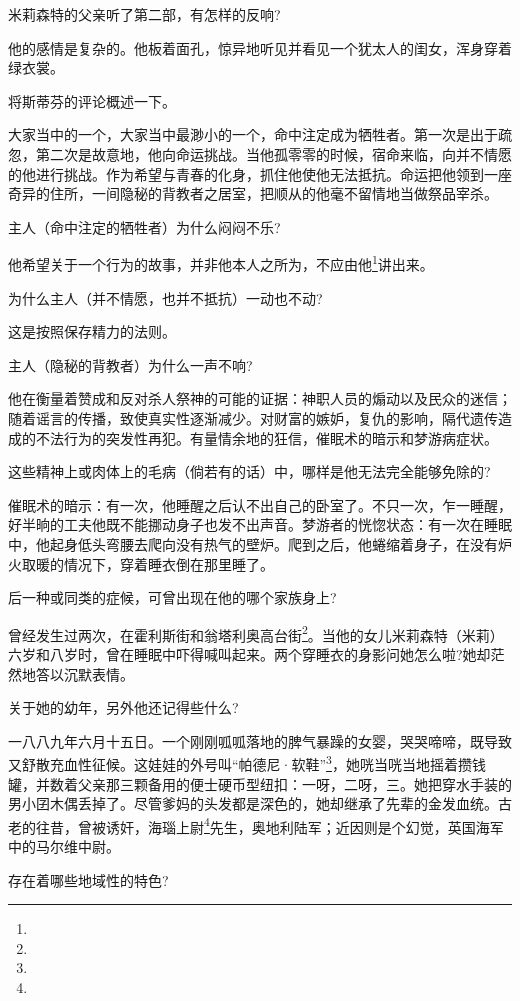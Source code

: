 \par 米莉森特的父亲听了第二部，有怎样的反响?
\par 他的感情是复杂的。他板着面孔，惊异地听见并看见一个犹太人的闺女，浑身穿着绿衣裳。
\par 将斯蒂芬的评论概述一下。
\par 大家当中的一个，大家当中最渺小的一个，命中注定成为牺牲者。第一次是出于疏忽，第二次是故意地，他向命运挑战。当他孤零零的时候，宿命来临，向并不情愿的他进行挑战。作为希望与青春的化身，抓住他使他无法抵抗。命运把他领到一座奇异的住所，一间隐秘的背教者之居室，把顺从的他毫不留情地当做祭品宰杀。
\par 主人（命中注定的牺牲者）为什么闷闷不乐?
\par 他希望关于一个行为的故事，并非他本人之所为，不应由他\footnote{}讲出来。
\par 为什么主人（并不情愿，也并不抵抗）一动也不动?
\par 这是按照保存精力的法则。
\par 主人（隐秘的背教者）为什么一声不响?
\par 他在衡量着赞成和反对杀人祭神的可能的证据：神职人员的煽动以及民众的迷信；随着谣言的传播，致使真实性逐渐减少。对财富的嫉妒，复仇的影响，隔代遗传造成的不法行为的突发性再犯。有量情余地的狂信，催眠术的暗示和梦游病症状。
\par 这些精神上或肉体上的毛病（倘若有的话）中，哪样是他无法完全能够免除的?
\par 催眠术的暗示：有一次，他睡醒之后认不出自己的卧室了。不只一次，乍一睡醒，好半晌的工夫他既不能挪动身子也发不出声音。梦游者的恍惚状态：有一次在睡眠中，他起身低头弯腰去爬向没有热气的壁炉。爬到之后，他蜷缩着身子，在没有炉火取暖的情况下，穿着睡衣倒在那里睡了。
\par 后一种或同类的症候，可曾出现在他的哪个家族身上?
\par 曾经发生过两次，在霍利斯街和翁塔利奥高台街\footnote{}。当他的女儿米莉森特（米莉）六岁和八岁时，曾在睡眠中吓得喊叫起来。两个穿睡衣的身影问她怎么啦?她却茫然地答以沉默表情。
\par 关于她的幼年，另外他还记得些什么?
\par 一八八九年六月十五日。一个刚刚呱呱落地的脾气暴躁的女婴，哭哭啼啼，既导致又舒散充血性征候。这娃娃的外号叫“帕德尼·软鞋”\footnote{}，她咣当咣当地摇着攒钱罐，并数着父亲那三颗备用的便士硬币型纽扣：一呀，二呀，三。她把穿水手装的男小囝木偶丢掉了。尽管爹妈的头发都是深色的，她却继承了先辈的金发血统。古老的往昔，曾被诱奸，海瑙上尉\footnote{}先生，奥地利陆军；近因则是个幻觉，英国海军中的马尔维中尉。
\par 存在着哪些地域性的特色?
